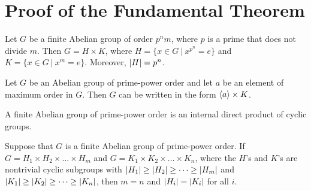 \section{Proof of the Fundamental Theorem}

\begin{lemma}
	Let $G$ be a finite Abelian group of order $p^nm$, where $p$ is a prime that does not divide $m$. Then $G = H \times K$, where $H = \{x \in G\ \vert\ x^{p^n} =e\}$ and $K =\{x \in G\ \vert\ x^m = e\}$. Moreover, $\left\lvert H \right\rvert=p^n$.
\end{lemma}

\begin{lemma}
	Let $G$ be an Abelian group of prime-power order and let $a$ be an element of maximum order in $G$. Then $G$ can be written in the form $\langle a \rangle \times K$.
\end{lemma}

\begin{lemma}
	A finite Abelian group of prime-power order is an internal direct product of cyclic groups.
\end{lemma}

\begin{lemma}
	Suppose that $G$ is a finite Abelian group of prime-power order. If $G=H_1 \times H_2 \times \dots \times H_m$ and $G=K_1 \times K_2 \times \dots \times K_n$, where the $H$'s and $K$'s are nontrivial cyclic subgroups with $\left\lvert H_1 \right\rvert \geq \left\lvert H_2 \right\rvert \geq \dots \geq \left\lvert H_m \right\rvert$ and $\left\lvert K_1 \right\rvert \geq \left\lvert K_2 \right\rvert \geq \dots \geq \left\lvert K_n \right\rvert$, then $m=n$ and $\left\lvert H_i \right\rvert = \left\lvert K_i \right\rvert$ for all $i$.
\end{lemma}
